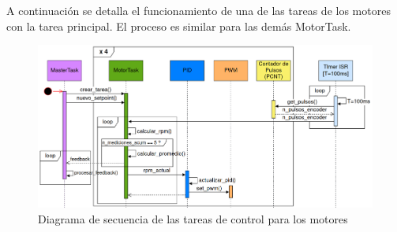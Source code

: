 A continuación se detalla el funcionamiento de una de las tareas de los motores con la tarea principal. El proceso es similar para las demás MotorTask.

\begin{figure}[H]
    \centering
    \includegraphics[width=1.1\linewidth]{images/diag_secuencia_pid_solo.png}
    \caption{Diagrama de secuencia de las tareas de control para los motores}
    \label{fig:diagsecuenciapidsolo}
\end{figure}
